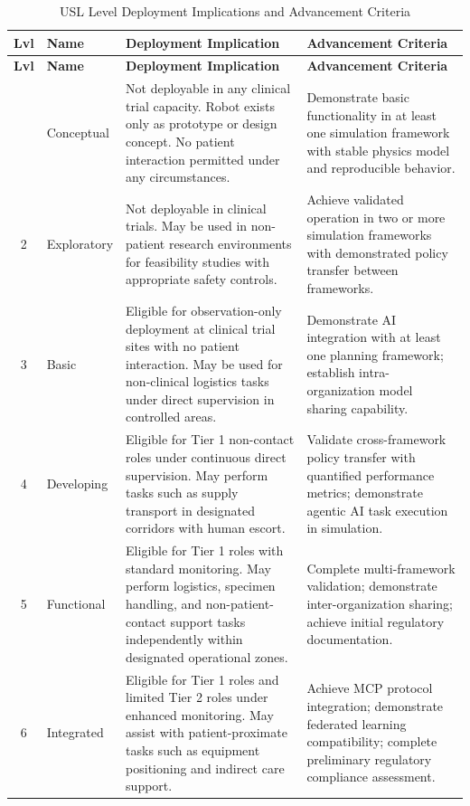 \begin{longtable}{c l p{5.5cm} p{5.5cm}}
\caption{USL Level Deployment Implications and Advancement Criteria}
\label{tab:usl-level-implications} \\
\toprule
\textbf{Lvl} & \textbf{Name} & \textbf{Deployment Implication} & \textbf{Advancement Criteria} \\
\midrule
\endfirsthead
\toprule
\textbf{Lvl} & \textbf{Name} & \textbf{Deployment Implication} & \textbf{Advancement Criteria} \\
\midrule
\endhead
\bottomrule
\endfoot
1 & Conceptual & Not deployable in any clinical trial capacity. Robot exists only as prototype or design concept. No patient interaction permitted under any circumstances. & Demonstrate basic functionality in at least one simulation framework with stable physics model and reproducible behavior. \\
2 & Exploratory & Not deployable in clinical trials. May be used in non-patient research environments for feasibility studies with appropriate safety controls. & Achieve validated operation in two or more simulation frameworks with demonstrated policy transfer between frameworks. \\
3 & Basic & Eligible for observation-only deployment at clinical trial sites with no patient interaction. May be used for non-clinical logistics tasks under direct supervision in controlled areas. & Demonstrate AI integration with at least one planning framework; establish intra-organization model sharing capability. \\
4 & Developing & Eligible for Tier 1 non-contact roles under continuous direct supervision. May perform tasks such as supply transport in designated corridors with human escort. & Validate cross-framework policy transfer with quantified performance metrics; demonstrate agentic AI task execution in simulation. \\
5 & Functional & Eligible for Tier 1 roles with standard monitoring. May perform logistics, specimen handling, and non-patient-contact support tasks independently within designated operational zones. & Complete multi-framework validation; demonstrate inter-organization sharing; achieve initial regulatory documentation. \\
6 & Integrated & Eligible for Tier 1 roles and limited Tier 2 roles under enhanced monitoring. May assist with patient-proximate tasks such as equipment positioning and indirect care support. & Achieve MCP protocol integration; demonstrate federated learning compatibility; complete preliminary regulatory compliance assessment. \\

\end{longtable}
